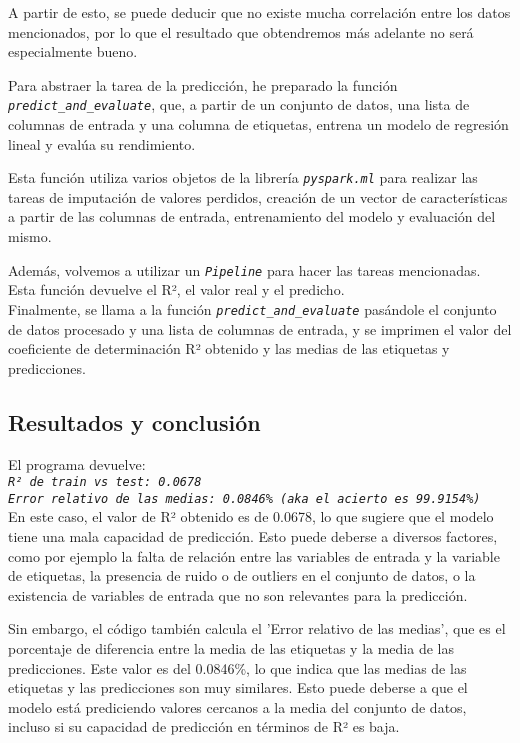 \documentclass[
12pt, 
spanish, 
singlespacing,
headsepline
]{article}
\newcommand{\code}[1]{\textit{\texttt{#1}}}
\begin{document}
A partir de esto, se puede deducir que no existe mucha correlación entre los datos mencionados, por lo que el resultado que obtendremos más adelante no será especialmente bueno.

Para abstraer la tarea de la predicción, he preparado la función \code{predict_and_evaluate}, que, a partir de un conjunto de datos, una lista de columnas de entrada y una columna de etiquetas, entrena un modelo de regresión lineal y evalúa su rendimiento. 

Esta función utiliza varios objetos de la librería \code{pyspark.ml} para realizar las tareas de imputación de valores perdidos, creación de un vector de características a partir de las columnas de entrada, entrenamiento del modelo y evaluación del mismo.

Además, volvemos a utilizar un \code{Pipeline} para hacer las tareas mencionadas.
Esta función devuelve el R², el valor real y el predicho.
\\

Finalmente, se llama a la función \code{predict_and_evaluate} pasándole el conjunto de datos procesado y una lista de columnas de entrada, y se imprimen el valor del coeficiente de determinación R² obtenido y las medias de las etiquetas y predicciones.

\subsection{Resultados y conclusión}
El programa devuelve:
\\
\code{R² de train vs test: 0.0678\\
Error relativo de las medias: 0.0846\% (aka el acierto es 99.9154\%)} 
\\

En este caso, el valor de R² obtenido es de 0.0678, lo que sugiere que el modelo tiene una mala capacidad de predicción. Esto puede deberse a diversos factores, como por ejemplo la falta de relación entre las variables de entrada y la variable de etiquetas, la presencia de ruido o de outliers en el conjunto de datos, o la existencia de variables de entrada que no son relevantes para la predicción.

Sin embargo, el código también calcula el 'Error relativo de las medias', que es el porcentaje de diferencia entre la media de las etiquetas y la media de las predicciones. Este valor es del 0.0846\%, lo que indica que las medias de las etiquetas y las predicciones son muy similares. Esto puede deberse a que el modelo está prediciendo valores cercanos a la media del conjunto de datos, incluso si su capacidad de predicción en términos de R² es baja.
\end{document}
